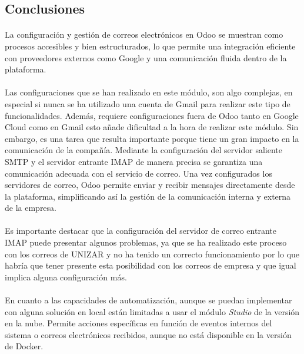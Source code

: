 \subsection{Conclusiones}
\paragraph{}
La configuración y gestión de correos electrónicos en Odoo se muestran como procesos accesibles y bien estructurados, lo que permite una integración eficiente con proveedores externos como Google y una comunicación fluida dentro de la plataforma.
\paragraph{}
Las configuraciones que se han realizado en este módulo, son algo complejas, en especial si nunca se ha utilizado una cuenta de Gmail para realizar este tipo de funcionalidades. Además, requiere configuraciones fuera de Odoo tanto en Google Cloud como en Gmail esto añade dificultad a la hora de realizar este módulo. Sin embargo, es una tarea que resulta importante porque tiene un gran impacto en la comunicación de la compañía. Mediante la configuración del servidor saliente SMTP y el servidor entrante IMAP de manera precisa se garantiza una comunicación adecuada con el servicio de correo. Una vez configurados los servidores de correo, Odoo permite enviar y recibir mensajes directamente desde la plataforma, simplificando así la gestión de la comunicación interna y externa de la empresa.
\paragraph{}
Es importante destacar que la configuración del servidor de correo entrante IMAP puede presentar algunos problemas, ya que se ha realizado este proceso con los correos de UNIZAR y no ha tenido un correcto funcionamiento por lo que habría que tener presente esta posibilidad con los correos de empresa y que igual implica alguna configuración más.
\paragraph{}
En cuanto a las capacidades de automatización, aunque se puedan implementar con alguna solución en local están limitadas a usar el módulo \textit{Studio} de la versión en la nube. Permite acciones específicas en función de eventos internos del sistema o correos electrónicos recibidos, aunque no está disponible en la versión de Docker.








